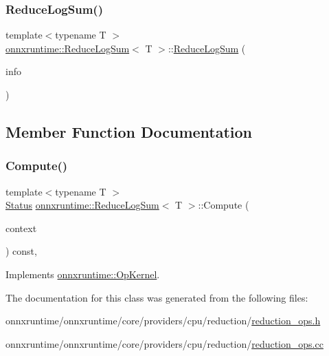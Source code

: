 \subsubsection{\texorpdfstring{Reduce\+Log\+Sum()}{ReduceLogSum()}}
{\footnotesize\ttfamily template$<$typename T $>$ \\
\mbox{\hyperlink{classonnxruntime_1_1ReduceLogSum}{onnxruntime\+::\+Reduce\+Log\+Sum}}$<$ T $>$\+::\mbox{\hyperlink{classonnxruntime_1_1ReduceLogSum}{Reduce\+Log\+Sum}} (\begin{DoxyParamCaption}\item[{const \mbox{\hyperlink{classonnxruntime_1_1OpKernelInfo}{Op\+Kernel\+Info}} \&}]{info }\end{DoxyParamCaption})\hspace{0.3cm}{\ttfamily [inline]}}



\subsection{Member Function Documentation}
\mbox{\label{classonnxruntime_1_1ReduceLogSum_a765bc011072315b0eaf48c9e45fdfd2b}} 
\subsubsection{\texorpdfstring{Compute()}{Compute()}}
{\footnotesize\ttfamily template$<$typename T $>$ \\
\mbox{\hyperlink{classonnxruntime_1_1common_1_1Status}{Status}} \mbox{\hyperlink{classonnxruntime_1_1ReduceLogSum}{onnxruntime\+::\+Reduce\+Log\+Sum}}$<$ T $>$\+::Compute (\begin{DoxyParamCaption}\item[{\mbox{\hyperlink{classonnxruntime_1_1OpKernelContext}{Op\+Kernel\+Context}} $\ast$}]{context }\end{DoxyParamCaption}) const\hspace{0.3cm}{\ttfamily [override]}, {\ttfamily [virtual]}}



Implements \mbox{\hyperlink{classonnxruntime_1_1OpKernel_a9eca8656a78b1b3ab9d3351a12798650}{onnxruntime\+::\+Op\+Kernel}}.



The documentation for this class was generated from the following files\+:\begin{DoxyCompactItemize}
\item 
onnxruntime/onnxruntime/core/providers/cpu/reduction/\mbox{\hyperlink{cpu_2reduction_2reduction__ops_8h}{reduction\+\_\+ops.\+h}}\item 
onnxruntime/onnxruntime/core/providers/cpu/reduction/\mbox{\hyperlink{cpu_2reduction_2reduction__ops_8cc}{reduction\+\_\+ops.\+cc}}\end{DoxyCompactItemize}
